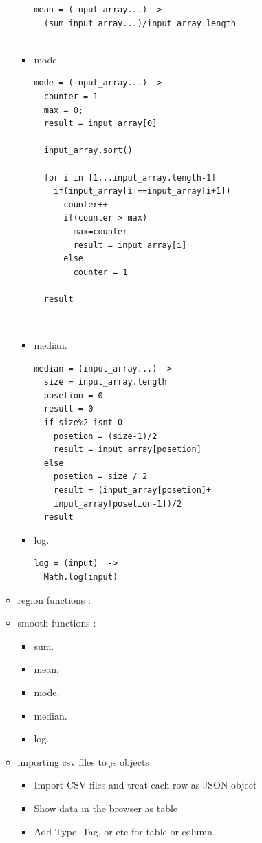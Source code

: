 \documentclass[12pt]{article}
\begin{document}
\begin{itemize}
\begin{itemize}
\begin{itemize}
\begin{lstlisting}[frame=single]
mean = (input_array...) ->
  (sum input_array...)/input_array.length
  
\end{lstlisting} 
\item mode.
\begin{lstlisting}[frame=single]
mode = (input_array...) ->
  counter = 1
  max = 0;
  result = input_array[0]

  input_array.sort()

  for i in [1...input_array.length-1]
    if(input_array[i]==input_array[i+1])
      counter++
      if(counter > max)
        max=counter
        result = input_array[i]
      else
        counter = 1

  result
\end{lstlisting}
\\
\item median. \\
\begin{lstlisting}[frame=single]
median = (input_array...) ->
  size = input_array.length
  posetion = 0
  result = 0
  if size%2 isnt 0
    posetion = (size-1)/2
    result = input_array[posetion]
  else
    posetion = size / 2
    result = (input_array[posetion]+
    input_array[posetion-1])/2
  result
\end{lstlisting} 
\item log. 
\begin{lstlisting}[frame=single]
log = (input)  ->
  Math.log(input)
\end{lstlisting}  
\end{itemize}
\item region functions :
\item smooth functions :
\begin{itemize}
\item sum.
\item mean.
\item mode.
\item median.
\item log.  
\end{itemize}
\end{itemize}
\begin{itemize}

\item importing csv files to js objects
\begin{itemize}
\item Import CSV files and treat each row as JSON object
\end{itemize}  
\begin{itemize}
\item Show data in the browser as table 
\end{itemize} 
\begin{itemize}
\item Add Type, Tag, or etc for table or column. 
\end{itemize} 


\end{itemize}
\end{itemize}
\end{document}
